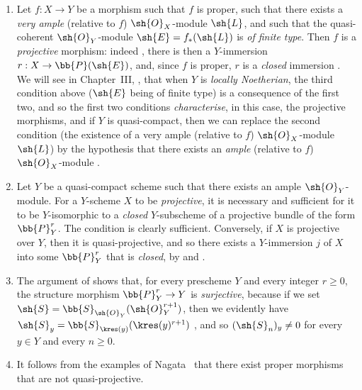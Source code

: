 \begin{remark}[5.5.4]
\label{II.5.5.4}
\medskip\noindent
\begin{enumerate}
  \item[(i)] Let $f:X\to Y$ be a morphism such that $f$ is proper, such that there exists a \emph{very ample} (relative to $f$) $\sh{O}_X$-module $\sh{L}$, and such that the quasi-coherent $\sh{O}_Y$-module $\sh{E}=f_*(\sh{L})$ is \emph{of finite type}.
    Then $f$ is a \emph{projective} morphism: indeed , there is then a $Y$-immersion $r:X\to\bb{P}(\sh{E})$, and, since $f$ is proper, $r$ is a \emph{closed} immersion .
    We will see in Chapter~III, , that when $Y$ is \emph{locally Noetherian}, the third condition above ($\sh{E}$ being of finite type) is a consequence of the first two, and so the first two conditions \emph{characterise}, in this case, the projective morphisms, and if $Y$ is quasi-compact, then we can replace the second condition (the existence of a very ample (relative to $f$) $\sh{O}_X$-module $\sh{L}$) by the hypothesis that there exists an \emph{ample} (relative to $f$) $\sh{O}_X$-module .
  \item[(ii)] Let $Y$ be a quasi-compact scheme such that there exists an ample $\sh{O}_Y$-module.
    For a $Y$-scheme $X$ to be \emph{projective}, it is necessary and sufficient for it to be $Y$-isomorphic to a \emph{closed} $Y$-subscheme of a projective bundle of the form $\bb{P}_Y^r$.
    The condition is clearly sufficient.
    Conversely, if $X$ is projective over $Y$, then it is quasi-projective, and so there exists a $Y$-immersion $j$ of $X$ into some $\bb{P}_Y^r$  that is \emph{closed}, by  and .
  \item[(iii)] The argument of  shows that, for every prescheme $Y$ and every integer $r\geq0$, the structure morphism $\bb{P}_Y^r\to Y$ is \emph{surjective}, because if we set $\sh{S}=\bb{S}_{\sh{O}_Y}(\sh{O}_Y^{r+1})$, then we evidently have $\sh{S}_y=\bb{S}_{\kres(y)}(\kres(y)^{r+1})$ , and so $(\sh{S}_n)_y\neq0$ for every $y\in Y$ and every $n\geq0$.
  \item[(iv)] It follows from the examples of Nagata~\cite{II-26} that there exist proper morphisms that are not quasi-projective.
\end{enumerate}
\end{remark}

